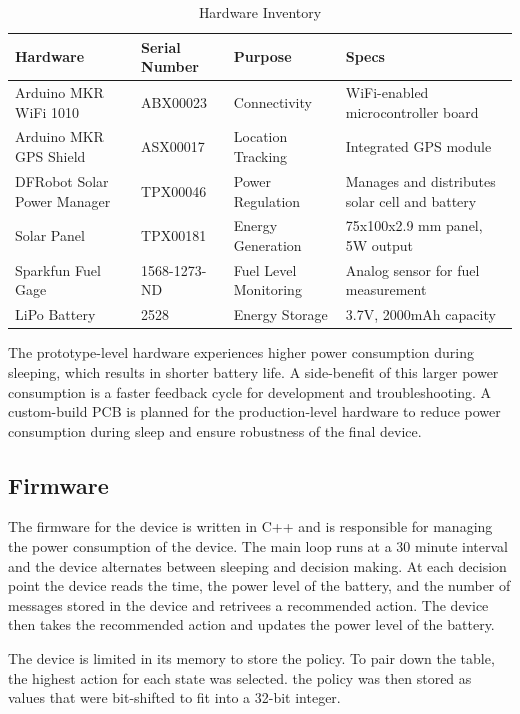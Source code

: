 \documentclass[10pt]{cai}
\begin{document}
\begin{table}[h!]
  \centering
  \caption{Hardware Inventory}
  \begin{tabular}{|l|l|l|l|}
  \hline
  \textbf{Hardware} & \textbf{Serial Number} & \textbf{Purpose} & \textbf{Specs} \\ \hline
  Arduino MKR WiFi 1010 & ABX00023 & Connectivity & WiFi-enabled microcontroller board \\ \hline
  Arduino MKR GPS Shield & ASX00017 & Location Tracking & Integrated GPS module \\ \hline
  DFRobot Solar Power Manager & TPX00046 & Power Regulation & Manages and distributes solar cell and battery \\ \hline
  Solar Panel & TPX00181 & Energy Generation & 75x100x2.9 mm panel, 5W output \\ \hline
  Sparkfun Fuel Gage & 1568-1273-ND & Fuel Level Monitoring & Analog sensor for fuel measurement \\ \hline
  LiPo Battery & 2528 & Energy Storage & 3.7V, 2000mAh capacity \\ \hline
  \end{tabular}
  \label{tab:hardware_inventory}
  \end{table}

The prototype-level hardware experiences higher power consumption during sleeping, which results in shorter battery life. 
A side-benefit of this larger power consumption is a faster feedback cycle for development and troubleshooting. 
A custom-build PCB is planned for the production-level hardware to reduce power consumption during sleep and ensure robustness of the final device.

\subsection{Firmware}
The firmware for the device is written in C++ and is responsible for managing the power consumption of the device.
The main loop runs at a 30 minute interval and the device alternates between sleeping and decision making.
At each decision point the device reads the time, the power level of the battery, and the number of messages stored in the device and retrivees a recommended action.
The device then takes the recommended action and updates the power level of the battery.

The device is limited in its memory to store the policy.
To pair down the table, the highest action for each state was selected.
the policy was then stored as values that were bit-shifted to fit into a 32-bit integer.
\end{document}
